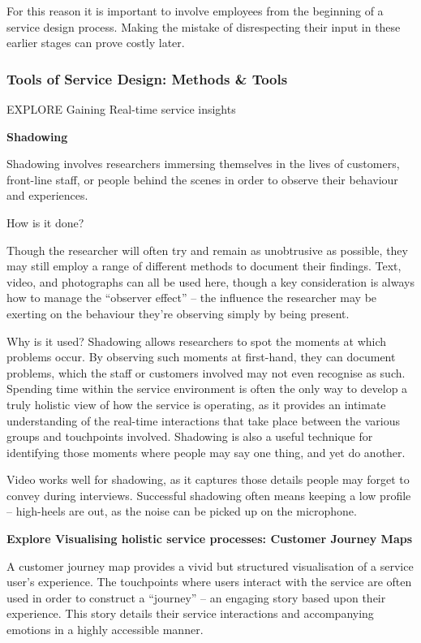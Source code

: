 For this reason it is important to involve employees from the beginning of a service design process. Making the mistake of disrespecting their input in these earlier stages can prove costly later.

\subsubsection{Tools of Service Design: Methods \& Tools}

EXPLORE Gaining Real-time service insights

\textbf{Shadowing}

Shadowing involves researchers immersing themselves in the lives of customers, front-line staff, or people behind the scenes in order to observe their behaviour and experiences.

How is it done?

Though the researcher will often try and remain as unobtrusive as possible, they may still employ a range of different methods to document their findings. Text, video, and photographs can all be used here, though a key consideration is always how to manage the “observer effect” – the influence the researcher may be exerting on the behaviour they’re observing simply by being present.

Why is it used?
Shadowing allows researchers to spot the moments at which problems occur. By observing such moments at first-hand, they can document problems, which the staff or customers involved may not even recognise as such. Spending time within the service environment is often the only way to develop a truly holistic view of how the service is operating, as it provides an intimate understanding of the real-time interactions that take place between the various groups and touchpoints involved. Shadowing is also a useful technique for identifying those moments where people may say one thing, and yet do another.

Video works well for shadowing, as it captures those details people may forget to convey during interviews. Successful shadowing often means keeping a low profile – high-heels are out, as the noise can be picked up on the microphone.

\textbf{Explore Visualising holistic service processes: Customer Journey Maps}

A customer journey map provides a vivid but structured visualisation of a service user’s experience. The touchpoints where users interact with the service are often used in order to construct a “journey” – an engaging story based upon their experience. This story details their service interactions and accompanying emotions in a highly accessible manner.

